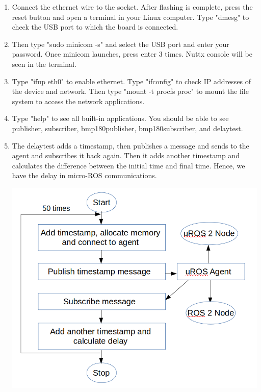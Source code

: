 \documentclass[%
xelatex,
	oneside,		%
	12pt,			%
	parskip=half,	%
	abstracton,
	chapterprefix=true%
    appendixprefix=true]
{scrbook}
\begin{document}
\begin{enumerate}
\item Connect the ethernet wire to the socket. After flashing is complete, press the reset button and open a terminal in your Linux computer. Type "dmesg" to check the USB port to which the board is connected.
\item Then type "sudo minicom -s" and select the USB port and enter your password. Once minicom launches, press enter 3 times. Nuttx console will be seen in the terminal.
\item Type "ifup eth0" to enable ethernet. Type "ifconfig" to check IP addresses of the device and network. Then type "mount -t procfs proc" to mount the file system to access the network applications.
\item Type "help" to see all built-in applications. You should be able to see publisher, subscriber, bmp180\textunderscore publisher, bmp180\textunderscore subscriber, and delay\textunderscore test.
\item The delay\textunderscore test adds a timestamp, then publishes a message and sends to the agent and subscribes it back again. Then it adds another timestamp and calculates the difference between the initial time and final time. Hence, we have the delay in micro-ROS communications.
\begin{center}
\hspace*{-1cm}\includegraphics[scale=0.3]{fig/delay.png}


\end{center}
\end{enumerate}
\end{document}
